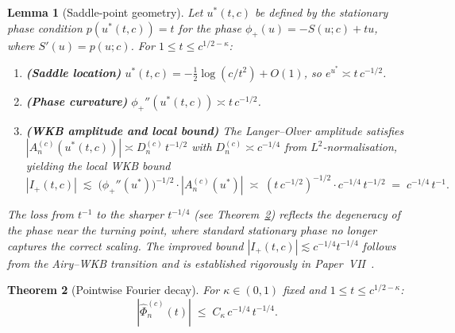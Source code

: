 \documentclass[12pt,a4paper]{amsart}
\newtheorem{theorem}{Theorem}[section]
\newtheorem{lemma}[theorem]{Lemma}
\theoremstyle{definition}
\theoremstyle{remark}
\begin{document}
\begin{lemma}[Saddle-point geometry]
\label{lem:amplitude-saddle}
Let $u^*(t,c)$ be defined by the stationary phase condition
$p(u^*(t,c)) = t$
for the phase $\phi_+(u) = -S(u;c) + tu$, where $S'(u) = p(u;c)$.
For $1 \le t \le c^{1/2-\kappa}$:
\begin{enumerate}[\rm(i)]
\item \textbf{(Saddle location)}
$u^*(t,c) = -\tfrac{1}{2}\log(c/t^2) + O(1)$,
so $e^{u^*} \asymp t\,c^{-1/2}$.
\item \textbf{(Phase curvature)}
$\phi_+''(u^*(t,c)) \asymp t\,c^{-1/2}$.
\item \textbf{(WKB amplitude and local bound)}
The Langer--Olver amplitude satisfies
$|A_n^{(c)}(u^*(t,c))| \asymp D_n^{(c)}\,t^{-1/2}$
with $D_n^{(c)} \asymp c^{-1/4}$ from $L^2$-normalisation,
yielding the local WKB bound
\[
|I_+(t,c)| \;\lesssim\;
\bigl(\phi_+''(u^*)\bigr)^{-1/2}\cdot|A_n^{(c)}(u^*)|
\;\asymp\; (t\,c^{-1/2})^{-1/2}\cdot c^{-1/4}\,t^{-1/2}
\;=\; c^{-1/4}\,t^{-1}.
\]
\end{enumerate}
The loss from $t^{-1}$ to the sharper $t^{-1/4}$ (see
Theorem~\ref{thm:pointwise}) reflects the degeneracy of the
phase near the turning point, where standard stationary phase
no longer captures the correct scaling.
The improved bound $|I_+(t,c)| \lesssim c^{-1/4}t^{-1/4}$
follows from the Airy--WKB transition
and is established rigorously in Paper~{\rm VII}~\cite{PaperVII}.
\end{lemma}

\begin{theorem}[Pointwise Fourier decay]
\label{thm:pointwise}
For $\kappa \in (0,1)$ fixed and $1 \le t \le c^{1/2-\kappa}$:
\begin{equation}
|\widehat\Phi_n^{(c)}(t)| \;\le\; C_\kappa\,c^{-1/4}\,t^{-1/4}.
\end{equation}
\end{theorem}
\end{document}
